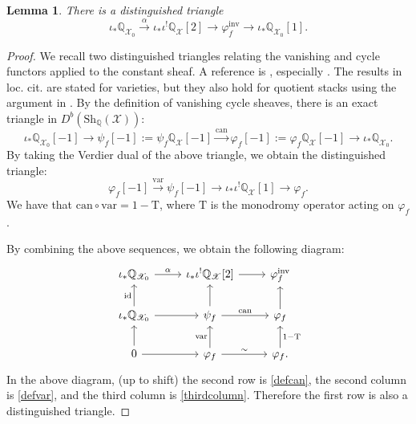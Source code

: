 \documentclass [11pt,oneside,a4paper,mathscr]{amsart}
\newtheorem{lemma}[thm]{Lemma}
\theoremstyle{definition}
\newcommand{\X}{\mathscr{X}}
\begin{document}
\begin{lemma}\label{lem:dist:minv}
There is a distinguished triangle 
\begin{equation}\label{defC}
\iota_*\mathbb{Q}_{\X_0}\xrightarrow{\alpha}\iota_*\iota^!\mathbb{Q}_{\X}[2]\to \varphi_f^{\mathrm{inv}}\to \iota_*\mathbb{Q}_{\X_0}[1].
\end{equation}
\end{lemma}
\begin{proof}
We recall two distinguished triangles relating the vanishing and cycle functors applied to the constant sheaf. 
A reference is \cite[Chapter 3]{Massey}, especially \cite[pages 24-28]{Massey}. The results in loc. cit. are stated for varieties, but they also hold for quotient stacks using the argument in \cite[Subsection 2.2]{DM}.
By the definition of vanishing cycle sheaves, 
there is an exact triangle in $D^b(\mathrm{Sh}_{\mathbb{Q}}(\X))$: 
\begin{equation}\label{defcan}
\iota_*\mathbb{Q}_{\X_0}[-1]\to \psi_f[-1]:=\psi_f\mathbb{Q}_\X[-1]\xrightarrow{\mathrm{can}} \varphi_f[-1]:=\varphi_f\mathbb{Q}_\X[-1]\rightarrow \iota_*\mathbb{Q}_{\X_0}.
\end{equation}
By taking the Verdier dual of the above triangle, we obtain the distinguished triangle:
\begin{equation}\label{defvar}
\varphi_f[-1]\xrightarrow{\mathrm{var}} \psi_f[-1]\to \iota_*\iota^!\mathbb{Q}_{\X}[1]\rightarrow \varphi_f.
\end{equation}
We have that $\mathrm{can}\circ\mathrm{var}=1-\mathrm{T}$, where $\mathrm{T}$ is the monodromy operator acting on $\varphi_f$.

By combining the above 
sequences, we obtain the 
following diagram:
\begin{equation}\label{diagsec4}
    \begin{tikzcd}
        \iota_*\mathbb{Q}_{\X_0}\arrow[r, "\alpha"]& \iota_*\iota^!\mathbb{Q}_{\X}[2]\arrow[r]& \varphi_f^{\mathrm{inv}}\\
        \iota_*\mathbb{Q}_{\X_0}\arrow[u, "\text{id}"]\arrow[r]& \psi_f \arrow[u]\arrow[r, "\mathrm{can}"]& \varphi_f\arrow[u]\\
        0\arrow[u]\arrow[r]& \varphi_f\arrow[u, "\mathrm{var}"]\arrow[r, "\sim"]& \varphi_f\arrow[u, "1-\mathrm{T}"'].
    \end{tikzcd}
\end{equation}
In the above diagram, (up to shift) the second row is \eqref{defcan}, the second column is \eqref{defvar}, and the third column is \eqref{thirdcolumn}.
Therefore the first row is also a distinguished triangle. 
\end{proof}
\end{document}
